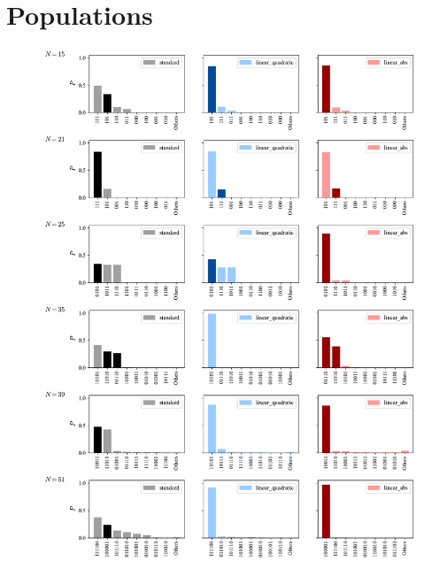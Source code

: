 \newpage
\section{Populations}
\label{Section:PopulationPlots}

\begin{figure}[H]
    \centering
    \includegraphics[width=1\textwidth]{06-appendix/figs/populations_all1.pdf}
\end{figure}

